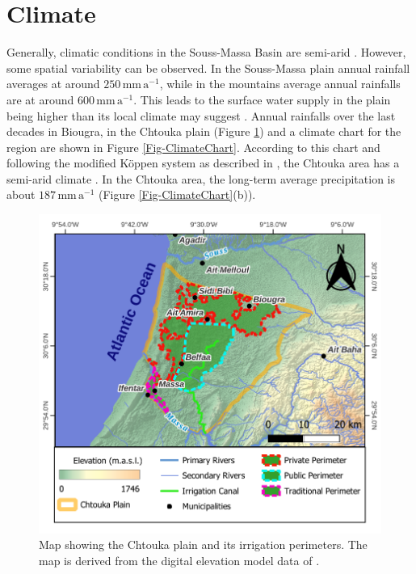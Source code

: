 \section{Climate}
\label{Sec-SouMaClimate}

Generally, climatic conditions in the Souss-Massa Basin are semi-arid \parencite{Choukr.2017}. 
However, some spatial variability can be observed. 
In the Souss-Massa plain annual rainfall averages at around $250 \, \textrm{mm} \, \textrm{a}^{-1}$, while in the mountains average annual rainfalls are at around $600 \, \textrm{mm} \, \textrm{a}^{-1}$. 
This leads to the surface water supply in the plain being higher than its local climate may suggest \parencite{Hssaisoune.2017}. 
Annual rainfalls over the last decades in Biougra, in the Chtouka plain (Figure \ref{Map-ChtoukaOverview}) and a climate chart for the region are shown in Figure \ref{Fig-ClimateChart}. 
According to this chart and following the modified Köppen system as described in \textcite{Critchfield.1983}, the Chtouka area has a semi-arid climate \parencite{Choukr.2017}. 
In the Chtouka area, the long-term average precipitation is about $ 187 \, \textrm{mm} \, \textrm{a}^{-1}$ (Figure \ref{Fig-ClimateChart}(b)).

\begin{figure}[p]
    \centering
    \includegraphics[width=1\textwidth]{./img/Map_ChtoukaOverview.pdf}
    \captionsetup{format=hang, labelfont=bf, textfont=it}
    \caption{Map showing the Chtouka plain and its irrigation perimeters. The map is derived from the digital elevation model data of \cite{NASA.SRTM1Arc}.}
    \label{Map-ChtoukaOverview}
\end{figure}

